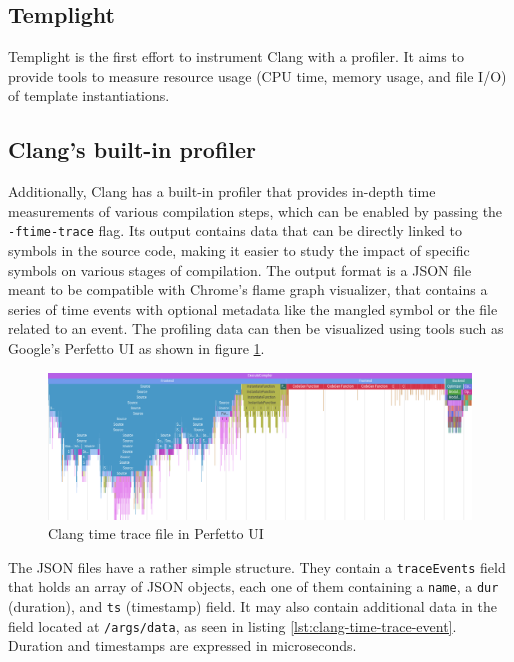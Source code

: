 \documentclass[../main]{subfiles}
\begin{document}
\subsection{
  Templight
}

Templight\cite{templight} is the first effort to instrument Clang with a
profiler. It aims to provide tools to measure resource usage (CPU time,
memory usage, and file I/O) of template instantiations.

\subsection{
  Clang's built-in profiler
}

Additionally, Clang has a built-in profiler\cite{time-trace} that provides
in-depth time measurements of various compilation steps, which can be enabled by
passing the \lstinline{-ftime-trace} flag. Its output contains data that can be
directly linked to symbols in the source code, making it easier to study the
impact of specific symbols on various stages of compilation. The output format
is a JSON file meant to be compatible with Chrome's flame graph visualizer, that
contains a series of time events with optional metadata like the mangled \cpp
symbol or the file related to an event. The profiling data can then be
visualized using tools such as Google's Perfetto UI as shown in figure
\ref{fig:perfetto-time-trace-ui}.

\begin{figure}[h]
\includegraphics[scale=0.264]{images/perfetto-ui.png}
\caption{Clang time trace file in Perfetto UI}
\label{fig:perfetto-time-trace-ui}
\end{figure}

The JSON files have a rather simple structure. They contain a
\lstinline{traceEvents} field that holds an array of JSON objects, each one of
them containing a \lstinline{name}, a \lstinline{dur} (duration), and
\lstinline{ts} (timestamp) field. It may also contain additional data in the
field located at \lstinline{/args/data}, as seen in listing
\ref{lst:clang-time-trace-event}. Duration and timestamps are expressed in
microseconds.
\end{document}

